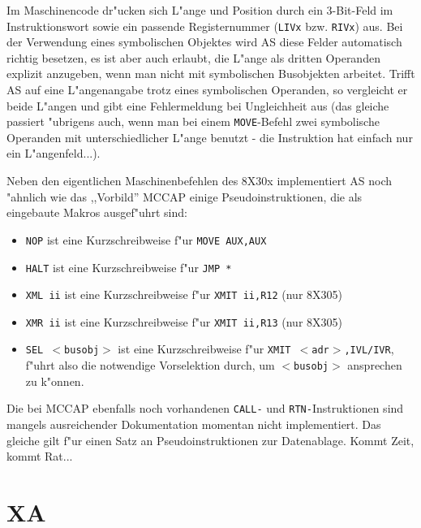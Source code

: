 \documentclass[12pt,a4paper,twoside]{report}
\newcommand{\tty}[1]{{\tt #1}}
\begin{document}
Im Maschinencode dr"ucken sich L"ange und Position durch ein 3-Bit-Feld
im Instruktionswort sowie ein passende Registernummer (\tty{LIVx} bzw.
\tty{RIVx}) aus.  Bei der Verwendung eines symbolischen Objektes wird AS
diese Felder automatisch richtig besetzen, es ist aber auch erlaubt,
die L"ange als dritten Operanden explizit anzugeben, wenn man nicht
mit symbolischen Busobjekten arbeitet.  Trifft AS auf eine L"angenangabe
trotz eines symbolischen Operanden, so vergleicht er beide L"angen
und gibt eine Fehlermeldung bei Ungleichheit aus (das gleiche passiert
"ubrigens auch, wenn man bei einem \tty{MOVE}-Befehl zwei symbolische
Operanden mit unterschiedlicher L"ange benutzt - die Instruktion hat
einfach nur ein L"angenfeld...).

Neben den eigentlichen Maschinenbefehlen des 8X30x implementiert AS
noch "ahnlich wie das ,,Vorbild'' MCCAP einige Pseudoinstruktionen, die
als eingebaute Makros ausgef"uhrt sind:
\begin{itemize}
\item{\tty{NOP} ist eine Kurzschreibweise f"ur \tty{MOVE AUX,AUX}}
\item{\tty{HALT} ist eine Kurzschreibweise f"ur {\tt JMP \verb!*!}}
\item{\tty{XML ii} ist eine Kurzschreibweise f"ur \tty{XMIT ii,R12} (nur
      8X305)}
\item{\tty{XMR ii} ist eine Kurzschreibweise f"ur \tty{XMIT ii,R13} (nur
      8X305)}
\item{\tty{SEL $<$busobj$>$} ist eine Kurzschreibweise f"ur
      \tty{XMIT $<$adr$>$,IVL/IVR}, f"uhrt also die notwendige Vorselektion
      durch, um \tty{$<$busobj$>$} ansprechen zu k"onnen.}
\end{itemize}
Die bei MCCAP ebenfalls noch vorhandenen \tty{CALL-} und
\tty{RTN-}Instruktionen sind mangels ausreichender Dokumentation momentan
nicht implementiert. Das gleiche gilt f"ur einen Satz an
Pseudoinstruktionen zur Datenablage. Kommt Zeit, kommt Rat...


\section{XA}
\end{document}
